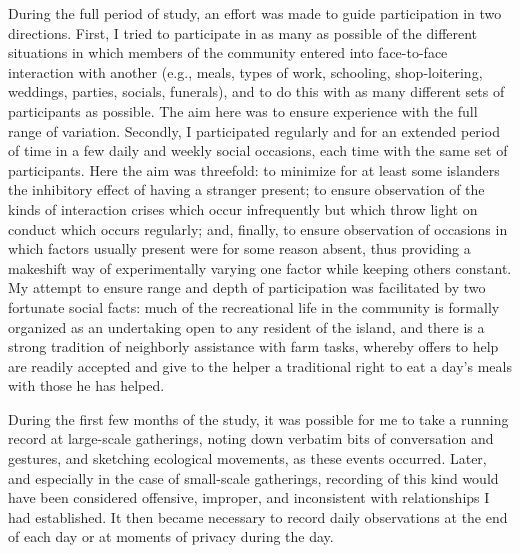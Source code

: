 \documentclass[openany,nobib]{tufte-book}
\begin{document}
During the full period of study, an effort was made to guide
participation in two directions. First, I tried to participate in as
many as possible of the different situations in which members of the
community entered into face-to-face interaction with another (e.g.,
meals, types of work, schooling, shop-loitering, weddings, parties,
socials, funerals), and to do this with as many different sets of
participants as possible. The aim here was to ensure experience with the
full range of variation. Secondly, I participated regularly and for an
extended period of time in a few daily and weekly social occasions, each
time with the same set of participants. Here the aim was threefold: to
minimize for at least some islanders the inhibitory effect of having a
stranger present; to ensure observation of the kinds of interaction
crises which occur infrequently but which throw light on conduct which
occurs regularly; and, finally, to ensure observation of occasions in
which factors usually present were for some reason absent, thus
providing a makeshift way of experimentally varying one factor while
keeping others constant. My attempt to ensure range and depth of
participation was facilitated by two fortunate social facts: much of the
recreational life in the community is formally organized as an
undertaking open to any resident of the island, and there is a strong
tradition of neighborly assistance with farm tasks, whereby offers to
help are readily accepted and give to the helper a traditional right to
eat a day's meals with those he has helped.

During the first few months of the study, it was possible for me to take
a running record at large-scale gatherings, noting down verbatim bits of
conversation and gestures, and sketching ecological movements, as these
events occurred. Later, and especially in the case of small-scale
gatherings, recording of this kind would have been considered offensive,
improper, and inconsistent with relationships I had established. It then
became necessary to record daily observations at the end of each day or
at moments of privacy during the day.
\end{document}

